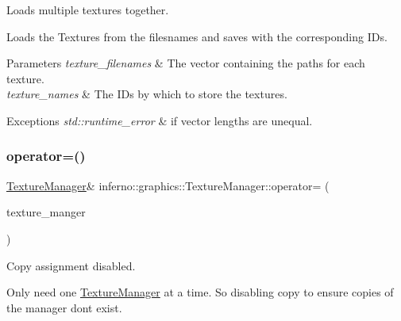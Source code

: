 Loads multiple textures together. 

Loads the Textures from the filesnames and saves with the corresponding I\+Ds. 
\begin{DoxyParams}{Parameters}
{\em texture\+\_\+filenames} & The vector containing the paths for each texture. \\
\hline
{\em texture\+\_\+names} & The I\+Ds by which to store the textures. \\
\hline
\end{DoxyParams}

\begin{DoxyExceptions}{Exceptions}
{\em std\+::runtime\+\_\+error} & if vector lengths are unequal. \\
\hline
\end{DoxyExceptions}
\mbox{\label{classinferno_1_1graphics_1_1_texture_manager_a328ab24dd273a41437c23abafbf978c0}} 
\subsubsection{\texorpdfstring{operator=()}{operator=()}\hspace{0.1cm}{\footnotesize\ttfamily [1/2]}}
{\footnotesize\ttfamily \mbox{\hyperlink{classinferno_1_1graphics_1_1_texture_manager}{Texture\+Manager}}\& inferno\+::graphics\+::\+Texture\+Manager\+::operator= (\begin{DoxyParamCaption}\item[{const \mbox{\hyperlink{classinferno_1_1graphics_1_1_texture_manager}{Texture\+Manager}} \&}]{texture\+\_\+manger }\end{DoxyParamCaption})\hspace{0.3cm}{\ttfamily [delete]}}



Copy assignment disabled. 

Only need one \mbox{\hyperlink{classinferno_1_1graphics_1_1_texture_manager}{Texture\+Manager}} at a time. So disabling copy to ensure copies of the manager don\textquotesingle{}t exist. \mbox{\label{classinferno_1_1graphics_1_1_texture_manager_ac413011a070590a960995b21eb4e3fdb}} 
